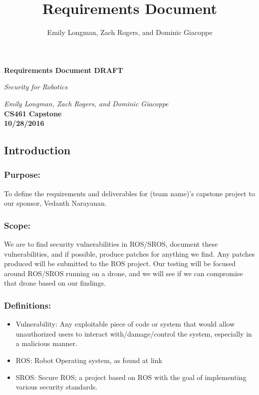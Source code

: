 \documentclass[IEEEtran,letterpaper,10pt,titlepage,draftclsnofoot,onecolumn]{article}
\title{Requirements Document}
\author{Emily Longman, Zach Rogers, and Dominic Giacoppe}
\begin{document}
\begin{titlepage}
  \begin{center}
    \vspace*{1cm}

    \huge
    \textbf{Requirements Document DRAFT}
  \vspace{0.5cm}

    \textit{Security for Robotics}\\
  \vspace{0.5cm}

    \textit{Emily Longman, Zach Rogers, and Dominic Giacoppe}\\
  \vspace{0.5cm}
    \vfill
    \large
    \textbf{CS461 Capstone}\\
  \vspace{5mm}
    \textbf{10/28/2016}\\

    \vfill
    \end{center}
\end{titlepage}

\subsection*{Introduction}

\subsubsection*{Purpose:}
To define the requirements and deliverables for (team name)'s capstone project to our sponsor, Vedanth Narayanan.

\subsubsection*{Scope:}
We are to find security vulnerabilities in ROS/SROS, document these vulnerabilities, and if possible, produce patches for anything we find. Any patches produced will be submitted to the ROS project. Our testing will be focused around ROS/SROS running on a drone, and we will see if we can compromise that drone based on our findings.

\subsubsection*{Definitions:}

\begin{itemize}
  \item Vulnerability: Any exploitable piece of code or system that would allow unauthorized users to interact with/damage/control the system, especially in a malicious manner.
  \item ROS: Robot Operating system, as found at link
  \item SROS: Secure ROS; a project based on ROS with the goal of implementing various security standards.
\end{itemize}
\end{document}
